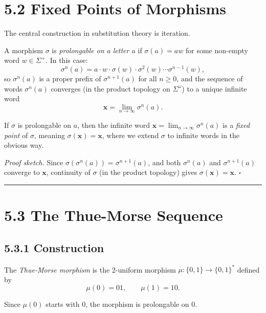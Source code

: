 \section{5.2 Fixed Points of Morphisms}

The central construction in substitution theory is iteration.

\begin{definition}
A morphism $\sigma$ is \textit{prolongable on a letter $a$} if $\sigma(a) = aw$ for some non-empty word $w \in \Sigma^+$. In this case:
\[
\sigma^n(a) = a \cdot w \cdot \sigma(w) \cdot \sigma^2(w) \cdots \sigma^{n-1}(w),
\]
so $\sigma^n(a)$ is a proper prefix of $\sigma^{n+1}(a)$ for all $n \geq 0$, and the sequence of words $\sigma^n(a)$ converges (in the product topology on $\Sigma^\omega$) to a unique infinite word
\[
\mathbf{x} = \lim_{n \to \infty} \sigma^n(a).
\]
\end{definition}

\begin{theorem}
If $\sigma$ is prolongable on $a$, then the infinite word $\mathbf{x} = \lim_{n \to \infty} \sigma^n(a)$ is a \textit{fixed point} of $\sigma$, meaning $\sigma(\mathbf{x}) = \mathbf{x}$, where we extend $\sigma$ to infinite words in the obvious way.

\textit{Proof sketch.} Since $\sigma(\sigma^n(a)) = \sigma^{n+1}(a)$, and both $\sigma^n(a)$ and $\sigma^{n+1}(a)$ converge to $\mathbf{x}$, continuity of $\sigma$ (in the product topology) gives $\sigma(\mathbf{x}) = \mathbf{x}$. $\square$

\bigskip\hrule\bigskip
\end{theorem}

\section{5.3 The Thue-Morse Sequence}

\subsection{5.3.1 Construction}

\begin{definition}
The \textit{Thue-Morse morphism} is the 2-uniform morphism $\mu: \{ 0,1\}  \to \{ 0,1\} ^*$ defined by
\[
\mu(0) = 01, \qquad \mu(1) = 10.
\]

Since $\mu(0)$ starts with $0$, the morphism is prolongable on $0$.
\end{definition}

